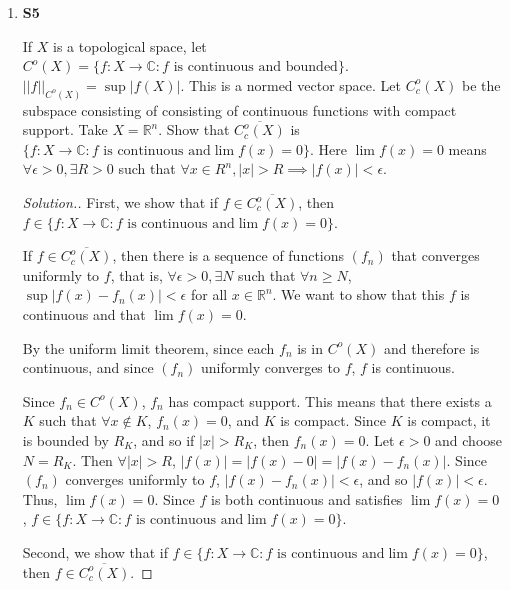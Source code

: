 \documentclass{article}
\newcommand{\R}{\mathbb{R}}
\newcommand{\C}{\mathbb{C}}
\newcommand{\sk}{\smallskip}
\begin{document}
\begin{enumerate}
    \item \textbf{S5}

    If $X$ is a topological space, let $C^o(X) = \{f: X \rightarrow \C : f \text{ is continuous and bounded}\}$. $||f||_{C^o(X)} = \sup |f(X)|$. This is a normed vector space. Let $C^o_c(X)$ be the subspace consisting of consisting of continuous functions with compact support. Take $X = \R^n$. Show that $\overline{C^o_c(X)}$ is $\{f: X \rightarrow \C : f \text{ is continuous and} \lim f(x) = 0\}$. Here $\lim f(x) = 0$ means $\forall \epsilon > 0, \exists R > 0$ such that $\forall x \in R^n, |x| > R \implies |f(x)| < \epsilon$.

    \begin{proof}[Solution.]
        First, we show that if $f \in \overline{C^o_c(X)}$, then $f \in \{f: X \rightarrow \C : f \text{ is continuous and} \lim f(x) = 0\}$. 

        \sk

        If $f \in \overline{C^o_c(X)}$, then there is a sequence of functions $(f_n)$ that converges uniformly to $f$, that is, $\forall \epsilon > 0, \exists N$ such that $\forall n \geq N$, $\sup |f(x) - f_n(x)| < \epsilon$ for all $x \in \R^n$. We want to show that this $f$ is continuous and that $\lim f(x) = 0$. 

        \sk

        By the uniform limit theorem, since each $f_n$ is in $C^o(X)$ and therefore is continuous, and since $(f_n)$ uniformly converges to $f$, $f$ is continuous. 

        \sk
        
        Since $f_n \in C^o(X)$, $f_n$ has compact support. This means that there exists a $K$ such that $\forall x \notin K$, $f_n(x) = 0$, and $K$ is compact. Since $K$ is compact, it is bounded by $R_K$, and so if $|x| > R_K$, then $f_n(x) = 0$. Let $\epsilon > 0$ and choose $N = R_K$. Then $\forall |x| > R$, $|f(x)| = |f(x) - 0| = |f(x) - f_n(x)|$. Since $(f_n)$ converges uniformly to $f$, $|f(x) - f_n(x)| < \epsilon$, and so $|f(x)| < \epsilon$. Thus, $\lim f(x) = 0$. Since $f$ is both continuous and satisfies $\lim f(x) = 0$, $f \in \{f: X \rightarrow \C : f \text{ is continuous and} \lim f(x) = 0\}$.

        \sk

        Second, we show that if $f \in \{f: X \rightarrow \C : f \text{ is continuous and} \lim f(x) = 0\}$, then $f \in \overline{C^o_c(X)}$. 

        \sk


\end{proof}
\end{enumerate}
\end{document}
